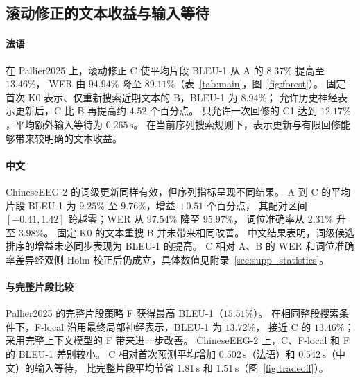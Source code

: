 \subsection{滚动修正的文本收益与输入等待}

\paragraph{法语}
在 Pallier2025 上，滚动修正 C 使平均片段 BLEU-1 从 A 的 $8.37\%$ 提高至 $13.46\%$，
WER 由 $94.94\%$ 降至 $89.11\%$（表~\ref{tab:main}，图~\ref{fig:forest}）。
固定首次 K0 表示、仅重新搜索近期文本的 B，BLEU-1 为 $8.94\%$；
允许历史神经表示更新后，C 比 B 再提高约 $4.52$ 个百分点。
只允许一次回修的 C1 达到 $12.17\%$，平均额外输入等待为 $0.265\,\mathrm{s}$。
在当前序列搜索规则下，表示更新与有限回修能够带来较明确的文本收益。

\paragraph{中文}
ChineseEEG-2 的词级更新同样有效，但序列指标呈现不同结果。
A 到 C 的平均片段 BLEU-1 为 $9.25\%$ 至 $9.76\%$，增益 $+0.51$ 个百分点，
其配对区间 $[-0.41,1.42]$ 跨越零；WER 从 $97.54\%$ 降至 $95.97\%$，
词位准确率从 $2.31\%$ 升至 $3.98\%$。
固定 K0 的文本重搜 B 并未带来相同改善。
中文结果表明，词级候选排序的增益未必同步表现为 BLEU-1 的提高。
C 相对 A、B 的 WER 和词位准确率差异经双侧 Holm 校正后仍成立，具体数值见附录~\ref{sec:supp_statistics}。

\paragraph{与完整片段比较}
Pallier2025 的完整片段策略 F 获得最高 BLEU-1（$15.51\%$）。
在相同整段搜索条件下，F-local 沿用最终局部神经表示，BLEU-1 为 $13.72\%$，
接近 C 的 $13.46\%$；采用完整上下文模型的 F 带来进一步改善。
ChineseEEG-2 上，C、F-local 和 F 的 BLEU-1 差别较小。
C 相对首次预测平均增加 $0.502\,\mathrm{s}$（法语）和 $0.542\,\mathrm{s}$（中文）的输入等待，
比完整片段平均节省 $1.81\,\mathrm{s}$ 和 $1.51\,\mathrm{s}$（图~\ref{fig:tradeoff}）。

\begin{table}[!htbp]
    \centering
    \papertablestyle
    \caption{四种输出策略的平均片段 BLEU-1 与 WER（\%）。完整六策略结果见附录表~\ref{tab:sequence_complete_metrics}。}
    \label{tab:main}
    \label{tab:sentence_revision_full}
    
\end{table}

